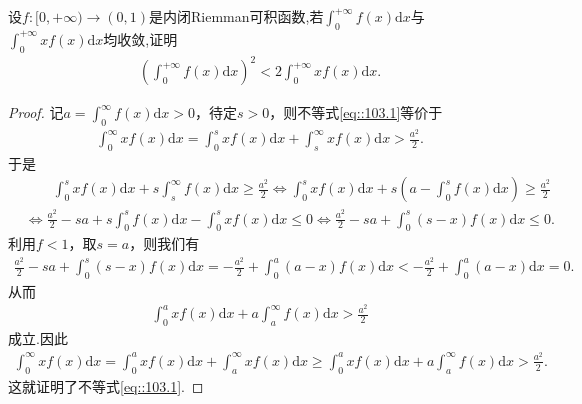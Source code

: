 \documentclass[../../main.tex]{subfiles}
\begin{document}
\begin{example}
设$f:[0,+\infty)\to (0,1)$是内闭Riemman可积函数,若$\int_0^{+\infty} f(x) \mathrm{d}x$与$\int_0^{+\infty} x f(x) \mathrm{d}x$均收敛,证明
\begin{align}
\left( \int_0^{+\infty} f(x) \mathrm{d}x \right)^2 < 2 \int_0^{+\infty} x f(x) \mathrm{d}x.\label{eq::103.1}
\end{align}
\end{example}
\begin{proof}
记$a=\int_0^{\infty} f(x) \mathrm{d}x>0$，待定$s>0$，则不等式\eqref{eq::103.1}等价于
\begin{align*}
\int_0^{\infty} x f(x) \mathrm{d}x = \int_0^s x f(x) \mathrm{d}x + \int_s^{\infty} x f(x) \mathrm{d}x > \frac{a^2}{2}.
\end{align*}
于是
\begin{align*}
&\quad \quad \int_0^s x f(x) \mathrm{d}x + s \int_s^{\infty} f(x) \mathrm{d}x \geqslant \frac{a^2}{2} \Longleftrightarrow \int_0^s x f(x) \mathrm{d}x + s \left( a - \int_0^s f(x) \mathrm{d}x \right) \geqslant \frac{a^2}{2} \\
&\Longleftrightarrow \frac{a^2}{2} - sa + s \int_0^s f(x) \mathrm{d}x - \int_0^s x f(x) \mathrm{d}x \leqslant 0 \Longleftrightarrow \frac{a^2}{2} - sa + \int_0^s (s - x) f(x) \mathrm{d}x \leqslant 0.
\end{align*}
利用$f<1$，取$s=a$，则我们有
\begin{align*}
\frac{a^2}{2} - sa + \int_0^s (s - x) f(x) \mathrm{d}x = -\frac{a^2}{2} + \int_0^a (a - x) f(x) \mathrm{d}x < -\frac{a^2}{2} + \int_0^a (a - x) \mathrm{d}x = 0.
\end{align*}
从而
\begin{align*}
\int_0^a x f(x) \mathrm{d}x + a \int_a^{\infty} f(x) \mathrm{d}x > \frac{a^2}{2}
\end{align*}
成立.因此
\begin{align*}
\int_0^{\infty} x f(x) \mathrm{d}x = \int_0^a x f(x) \mathrm{d}x + \int_a^{\infty} x f(x) \mathrm{d}x \geqslant \int_0^a x f(x) \mathrm{d}x + a \int_a^{\infty} f(x) \mathrm{d}x > \frac{a^2}{2}.
\end{align*}
这就证明了不等式\eqref{eq::103.1}.

\end{proof}
\end{document}
